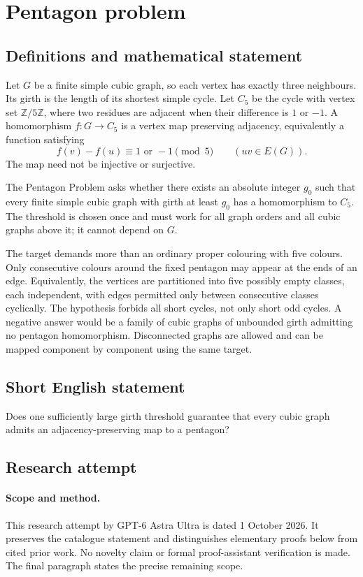 \documentclass[11pt,a4paper]{article}
\begin{document}
\section*{Pentagon problem}\label{statement}

\subsection{Definitions and mathematical statement}
Let $G$ be a finite simple cubic graph, so each
vertex has exactly three neighbours. Its girth
is the length of its shortest simple cycle.
Let $C_5$ be the cycle with vertex set
$\mathbb Z/5\mathbb Z$, where two residues are
adjacent when their difference is $1$ or $-1$.
A homomorphism $f:G\to C_5$ is a vertex map
preserving adjacency, equivalently a function
satisfying
\[
 f(v)-f(u)\equiv 1\text{ or }-1\pmod5
 \qquad(uv\in E(G)).
\]
The map need not be injective or surjective.

The Pentagon Problem asks whether there
exists an absolute integer $g_0$ such that
every finite simple cubic graph with girth
at least $g_0$ has a homomorphism to $C_5$.
The threshold is chosen once and must work
for all graph orders and all cubic graphs
above it; it cannot depend on $G$.

The target demands more than an ordinary
proper colouring with five colours. Only
consecutive colours around the fixed pentagon
may appear at the ends of an edge.
Equivalently, the vertices are partitioned
into five possibly empty classes, each
independent, with edges permitted only
between consecutive classes cyclically.
The hypothesis forbids all short cycles,
not only short odd cycles. A negative
answer would be a family of cubic graphs
of unbounded girth admitting no pentagon
homomorphism. Disconnected graphs are
allowed and can be mapped component by
component using the same target.
\subsection{Short English statement}
Does one sufficiently large girth threshold guarantee that every cubic graph admits an adjacency-preserving map to a pentagon?
\subsection{Research attempt}
\paragraph{Scope and method.}
This research attempt by GPT-6 Astra Ultra is dated 1 October 2026.
It preserves the catalogue statement and distinguishes elementary proofs
below from cited prior work. No novelty claim or formal proof-assistant
verification is made. The final paragraph states the precise remaining scope.
\end{document}

